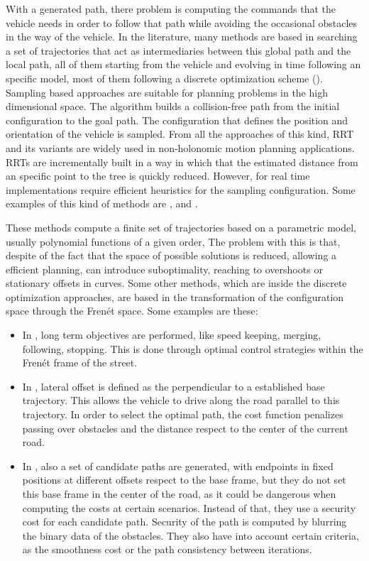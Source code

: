 With a generated path, there problem is computing the commands that the vehicle needs in order to follow that path while avoiding the occasional obstacles in the way of the vehicle. In the literature, many methods are based in searching a set of trajectories that act as intermediaries between this global path and the local path, all of them starting from the vehicle and evolving in time following an specific model, most of them following a discrete optimization scheme (\cite{thrun2006stanley, montemerlo2008junior, werling2010optimal, ferguson2008motion}).
Sampling based approaches are suitable for planning problems in the high dimensional space. The algorithm builds a collision-free path from the initial configuration to the goal path. The configuration that defines the position and orientation of the vehicle is sampled. From all the approaches of this kind, \ac{RRT} and its variants are widely used in non-holonomic motion planning applications.
\acp{RRT} are incrementally built in a way in which that the estimated distance from an specific point to the tree is quickly reduced. However, for real time implementations require efficient heuristics for the sampling configuration. 
Some examples of this kind of methods are \cite{van1997real}, \cite{lavalle2001randomized} and \cite{kuwata2009real}.

These methods compute a finite set of trajectories based on a parametric model, usually polynomial functions of a given order, The problem with this is that, despite of the fact that the space of possible solutions is reduced, allowing a efficient planning, can introduce suboptimality, reaching to overshoots or stationary offsets in curves.
Some other methods, which are inside the discrete optimization approaches, are based in the transformation of the configuration space through the Fren\'et space. Some examples are these:
\begin{itemize}
 \item In \cite{werling2010optimal}, long term objectives are performed, like speed keeping, merging, following, stopping. This is done through optimal control strategies within the Fren\'et frame of the street.
 \item In \cite{thrun2006stanley}, lateral offset is defined as the perpendicular to a established base trajectory. This allows the vehicle to drive along the road parallel to this trajectory. In order to select the optimal path, the cost function penalizes passing over obstacles and the distance respect to the center of the current road.
 \item In \cite{chu2012local}, also a set of candidate paths are generated, with endpoints in fixed positions at different offsets respect to the base frame, but they do not set this base frame in the center of the road, as it could be dangerous when computing the costs at certain scenarios. Instead of that, they use a security cost for each candidate path. Security of the path is computed by blurring the binary data of the obstacles. They also have into account certain criteria, as the smoothness cost or the path consistency between iterations.
\end{itemize}

